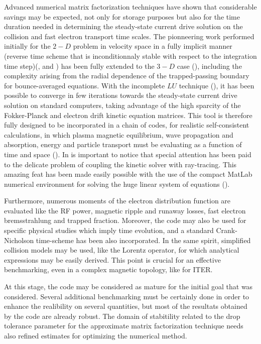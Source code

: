 Advanced numerical matrix factorization techniques have shown that
considerable savings may be expected, not only for storage purposes but also
for the time duration needed in determining the steady-state current drive
solution on the collision and fast electron transport time scales. The
pionneering work performed initially for the $2-D$ problem in velocity space
in a fully implicit manner (reverse time scheme that is inconditionnaly
stable with respect to the integration time step)(\cite{sho94},\cite{shk97}
and \cite{pey98}) has been fully extended to the $3-D$ case (\cite
{pey03c1_RF15}), including the complexity arising from the radial dependence
of the trapped-passing boundary for bounce-averaged equations. With the
incomplete $LU$ technique (\cite{saa03}), it has been possible to converge
in few iterations towards the steady-state current drive solution on
standard computers, taking advantage of the high sparcity of the
Fokker-Planck and electron drift kinetic equation matrices. This tool is
therefore fully designed to be incorporated in a chain of codes, for
realistic self-consistent calculations, in which plasma magnetic
equilibrium, wave propagation and absorption, energy and particle transport
must be evaluating as a function of time and space (\cite{bas03}). In is
important to notice that special attention has been paid to the delicate
problem of coupling the kinetic solver with ray-tracing. This amazing feat
has been made easily possible with the use of the compact MatLab numerical
environment for solving the huge linear system of equations (\cite{mat02}).

Furthermore, numerous moments of the electron distribution function are
evaluated like the RF power, magnetic ripple and runaway losses, fast
electron bremsstrahlung and trapped fraction. Moreover, the code may also be
used for specific physical studies which imply time evolution, and a
standard Crank-Nicholson time-scheme has been also incorporated. In the same
spirit, simplified collision models may be used, like the Lorentz operator,
for which analytical expressions may be easily derived. This point is
crucial for an effective benchmarking, even in a complex magnetic topology,
like for ITER.

At this stage, the code may be considered as mature for the initial goal
that was considered. Several additional benchmarking must be certainly done
in order to enhance the realibility on several quantities, but most of the
resultats obtained by the code are already robust. The domain of stabitility
related to the drop tolerance parameter for the approximate matrix
factorization technique needs also refined estimates for optimizing the
numerical method.


